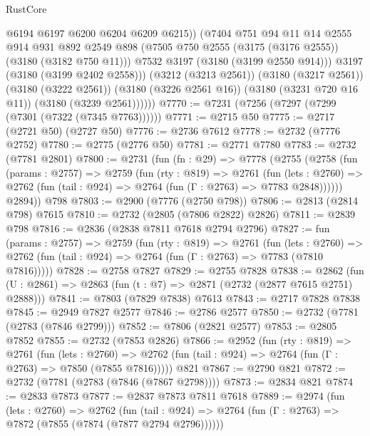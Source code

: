 \begin{lexlean}{RustCore}
\begin{coremodule}
                  @6194
                  @6197
                  @6200
                  @6204
                  @6209
                  @6215))
              (@7404
                @751
                @94
                @11
                @14
                @2555
                @914
                @931
                @892
                @2549
                @898
                (@7505 @750 @2555 (@3175 (@3176 @2555)) (@3180 (@3182 @750 @11)))
                @7532
                @3197
                (@3180 (@3199 @2550 @914)))
              @3197
              (@3180 (@3199 @2402 @2558)))
            (@3212 (@3213 @2561))
            (@3180 (@3217 @2561))
            (@3180 (@3222 @2561))
            (@3180 (@3226 @2561 @16))
            (@3180 (@3231 @720 @16 @11))
            (@3180 (@3239 @2561))))))
@7770 := @7231 (@7256 (@7297 (@7299 (@7301 (@7322 (@7345 @7763))))))
@7771 := @2715 @50
@7775 := @2717 (@2721 @50) (@2727 @50)
@7776 := @2736 @7612
@7778 := @2732 (@7776 @2752)
@7780 := @2775 (@2776 @50)
@7781 := @2771 @7780
@7783 := @2732 (@7781 @2801)
@7800 := @2731
    (fun (fn : @29) =>
    @7778
      (@2755
        (@2758
          (fun (params : @2757) =>
          @2759
            (fun (rty : @819) =>
            @2761
              (fun (lets : @2760) =>
              @2762 (fun (tail : @924) => @2764 (fun (Γ : @2763) => @7783 @2848))))))
        @2894))
    @798
@7803 := @2900 (@7776 (@2750 @798))
@7806 := @2813 (@2814 @798) @7615
@7810 := @2732 (@2805 (@7806 @2822) @2826)
@7811 := @2839 @798
@7816 := @2836 (@2838 @7811 @7618 @2794 @2796)
@7827 := fun (params : @2757) =>
  @2759
    (fun (rty : @819) =>
    @2761
      (fun (lets : @2760) =>
      @2762 (fun (tail : @924) => @2764 (fun (Γ : @2763) => @7783 (@7810 @7816)))))
@7828 := @2758 @7827
@7829 := @2755 @7828
@7838 := @2862 (fun (U : @2861) => @2863 (fun (t : @7) => @2871 (@2732 (@2877 @7615 @2751) @2888)))
@7841 := @7803 (@7829 @7838) @7613
@7843 := @2717 @7828 @7838
@7845 := @2949 @7827 @2577
@7846 := @2786 @2577
@7850 := @2732 (@7781 (@2783 (@7846 @2799)))
@7852 := @7806 (@2821 @2577)
@7853 := @2805 @7852
@7855 := @2732 (@7853 @2826)
@7866 := @2952
    (fun (rty : @819) =>
    @2761
      (fun (lets : @2760) =>
      @2762 (fun (tail : @924) => @2764 (fun (Γ : @2763) => @7850 (@7855 @7816)))))
    @821
@7867 := @2790 @821
@7872 := @2732 (@7781 (@2783 (@7846 (@7867 @2798))))
@7873 := @2834 @821
@7874 := @2833 @7873
@7877 := @2837 @7873 @7811 @7618
@7889 := @2974
    (fun (lets : @2760) =>
    @2762
      (fun (tail : @924) => @2764 (fun (Γ : @2763) => @7872 (@7855 (@7874 (@7877 @2794 @2796))))))

\end{coremodule}
\end{lexlean}
